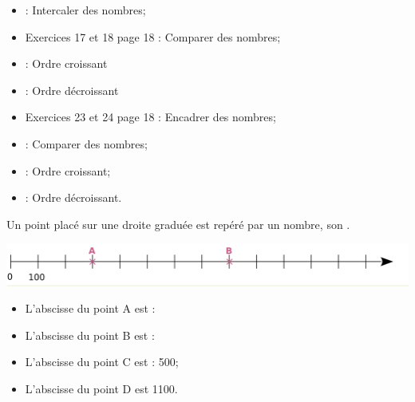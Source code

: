 \begin{myexos}
	\begin{itemize}
		\item {} : Intercaler des nombres;
		\item Exercices 17 et 18 page 18 : Comparer des nombres;
		\item {} : Ordre croissant
		\item {} : Ordre décroissant
		\item Exercices 23 et 24 page 18 : Encadrer des nombres;
		\item {} : Comparer des nombres;
		\item {} : Ordre croissant;
		\item {} : Ordre décroissant.
	\end{itemize}
\end{myexos}


\begin{myprop}
	Un point placé sur une droite graduée est repéré par un nombre, son .
\end{myprop}

\begin{myex}
	\begin{center}
		\includegraphics[scale=0.5]{img/axe}
	\end{center}

	\begin{itemize}
		\item L'abscisse du point A est :
		\item L'abscisse du point B est :
		\item L'abscisse du point C est : 500;
		\item L'abscisse du point D est \num{1100}.
	\end{itemize}
\end{myex}
